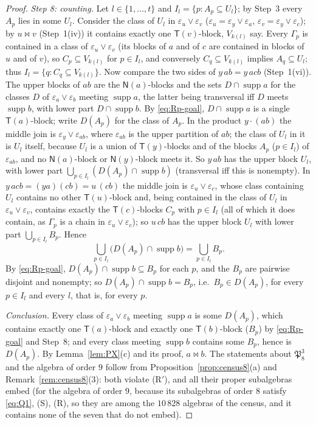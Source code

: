 \documentclass[11pt]{amsart}
\theoremstyle{definition}
\newcommand{\supp}{\operatorname{supp}}
\newcommand{\T}{\mathsf{T}}
\newcommand{\N}{\mathsf{N}}
\begin{document}
\begin{proof}
\emph{Step 8: counting.} Let $l\in\{1,\dots,t\}$ and $I_l=\{p:A_p\subseteq U_l\}$; by Step~3 every $A_p$ lies in some $U_l$. Consider the class of $U_l$ in $\varepsilon_u\vee\varepsilon_v$ ($\varepsilon_u=\varepsilon_y\vee\varepsilon_a$, $\varepsilon_v=\varepsilon_y\vee\varepsilon_c$); by $u\bowtie v$ (Step~1(iv)) it contains exactly one $\T(v)$-block, $V_{k(l)}$ say. Every $\Gamma_p$ is contained in a class of $\varepsilon_u\vee\varepsilon_v$ (its blocks of $a$ and of $c$ are contained in blocks of $u$ and of $v$), so $C_p\subseteq V_{k(l)}$ for $p\in I_l$, and conversely $C_q\subseteq V_{k(l)}$ implies $A_q\subseteq U_l$; thus $I_l=\{q:C_q\subseteq V_{k(l)}\}$. Now compare the two sides of $y\,ab=y\,acb$ (Step~1(vi)). The upper blocks of $ab$ are the $\N(a)$-blocks and the sets $D\cap\supp a$ for the classes $D$ of $\varepsilon_a\vee\varepsilon_b$ meeting $\supp a$, the latter being transversal iff $D$ meets $\supp b$, with lower part $D\cap\supp b$. By \eqref{eq:Rp-goal}, $D\cap\supp a$ is a single $\T(a)$-block; write $D(A_p)$ for the class of $A_p$. In the product $y\cdot(ab)$ the middle join is $\varepsilon_y\vee\varepsilon_{ab}$, where $\varepsilon_{ab}$ is the upper partition of $ab$; the class of $U_l$ in it is $U_l$ itself, because $U_l$ is a union of $\T(y)$-blocks and of the blocks $A_p$ ($p\in I_l$) of $\varepsilon_{ab}$, and no $\N(a)$-block or $\N(y)$-block meets it. So $y\,ab$ has the upper block $U_l$, with lower part $\bigcup_{p\in I_l}(D(A_p)\cap\supp b)$ (transversal iff this is nonempty). In $y\,acb=(ya)(cb)=u\,(cb)$ the middle join is $\varepsilon_u\vee\varepsilon_c$, whose class containing $U_l$ contains no other $\T(u)$-block and, being contained in the class of $U_l$ in $\varepsilon_u\vee\varepsilon_v$, contains exactly the $\T(c)$-blocks $C_p$ with $p\in I_l$ (all of which it does contain, as $\Gamma_p$ is a chain in $\varepsilon_u\vee\varepsilon_c$); so $u\,cb$ has the upper block $U_l$ with lower part $\bigcup_{p\in I_l}B_p$. Hence
\[
\bigcup_{p\in I_l}\bigl(D(A_p)\cap\supp b\bigr)=\bigcup_{p\in I_l}B_p .
\]
By \eqref{eq:Rp-goal}, $D(A_p)\cap\supp b\subseteq B_p$ for each $p$, and the $B_p$ are pairwise disjoint and nonempty; so $D(A_p)\cap\supp b=B_p$, i.e.\ $B_p\in D(A_p)$, for every $p\in I_l$ and every $l$, that is, for every $p$.

\emph{Conclusion.} Every class of $\varepsilon_a\vee\varepsilon_b$ meeting $\supp a$ is some $D(A_p)$, which contains exactly one $\T(a)$-block and exactly one $\T(b)$-block ($B_p$) by \eqref{eq:Rp-goal} and Step~8; and every class meeting $\supp b$ contains some $B_p$, hence is $D(A_p)$. By Lemma~\ref{lem:PX}(c) and its proof, $a\bowtie b$. The statements about $\mathfrak P_8^3$ and the algebra of order $9$ follow from Proposition~\ref{prop:census8}(a) and Remark~\ref{rem:census8}(3): both violate (R$'$), and all their proper subalgebras embed (for the algebra of order $9$, because its subalgebras of order $8$ satisfy \eqref{eq:Q1}, (S), (R), so they are among the $10\,828$ algebras of the census, and it contains none of the seven that do not embed).
\end{proof}
\end{document}
